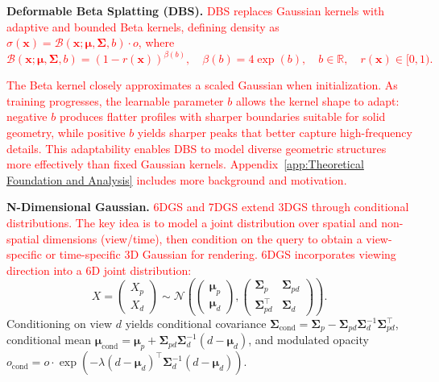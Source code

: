\documentclass{article} %
\begin{document}
\textbf{Deformable Beta Splatting (DBS).}
\textcolor{red}{DBS \citep{liu2025deformable} replaces Gaussian kernels with adaptive and bounded Beta kernels, defining density as $\sigma(\bm{x}) = \mathcal{B}(\bm{x};\bm{\mu},\bm{\Sigma},b) \cdot o$, where
\begin{equation}
\mathcal{B}(\bm{x};\bm{\mu},\bm{\Sigma},b) = (1 - r(\bm{x}))^{\beta(b)}, \quad \beta(b) = 4\exp(b), \quad b \in \mathbb{R}, \quad r(\bm{x}) \in [0, 1).
\end{equation}}

\textcolor{red}{The Beta kernel closely approximates a scaled Gaussian when initialization. As training progresses, the learnable parameter $b$ allows the kernel shape to adapt: negative $b$ produces flatter profiles with sharper boundaries suitable for solid geometry, while positive $b$ yields sharper peaks that better capture high-frequency details. This adaptability enables DBS to model diverse geometric structures more effectively than fixed Gaussian kernels. Appendix~\ref{app:Theoretical Foundation and Analysis} includes more background and motivation.}

\textbf{N-Dimensional Gaussian.}
\textcolor{red}{6DGS \citep{gao20246dgs} and 7DGS \citep{gao20257dgs} extend 3DGS through conditional distributions. The key idea is to model a joint distribution over spatial and non-spatial dimensions (view/time), then condition on the query to obtain a view-specific or time-specific 3D Gaussian for rendering. 6DGS incorporates viewing direction into a 6D joint distribution:}
\begin{equation}
X = \begin{pmatrix} X_p \\ X_d \end{pmatrix} \sim \mathcal{N}\!\left(
\begin{pmatrix}
\bm{\mu}_p \\ \bm{\mu}_d
\end{pmatrix},
\begin{pmatrix}
\bm{\Sigma}_p & \bm{\Sigma}_{pd} \\
\bm{\Sigma}_{pd}^\top & \bm{\Sigma}_d
\end{pmatrix}
\right).
\end{equation}
Conditioning on view $d$ yields conditional covariance $\bm{\Sigma}_{\text{cond}} = \bm{\Sigma}_p - \bm{\Sigma}_{pd}\bm{\Sigma}_d^{-1}\bm{\Sigma}_{pd}^\top$, conditional mean $\bm{\mu}_{\text{cond}} = \bm{\mu}_p + \bm{\Sigma}_{pd}\bm{\Sigma}_d^{-1}(d-\bm{\mu}_d)$, and modulated opacity $o_{\text{cond}} = o \cdot \exp(-\lambda(d-\bm{\mu}_d)^\top\bm{\Sigma}_d^{-1}(d-\bm{\mu}_d))$.
\end{document}
